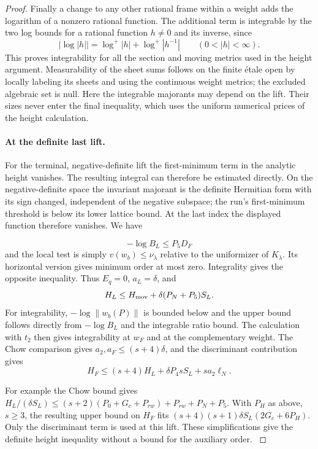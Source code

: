 \begin{proof}
Finally a change to any other rational frame within a
weight adds the logarithm of a nonzero rational function.
The additional term is integrable by the two log bounds for a rational function \(h\ne0\) and its inverse, since
\[
  \big|\log |h|\big|=\log^+|h|+\log^+|h^{-1}|\qquad(0<|h|<\infty).
\]
This proves integrability for all the section and moving
metrics used in the height argument. Measurability of the
sheet sums follows on the finite \'etale open by locally
labeling its sheets and using the continuous weight metrics;
the excluded algebraic set is null. Here the integrable
majorants may depend on the lift. Their sizes never enter
the final inequality, which uses the uniform numerical
prices of the height calculation. \label{cor:slice-integrals-2}

\paragraph{At the definite last lift.}
For the terminal, negative-definite lift the first-minimum term in the analytic height vanishes. The resulting integral can therefore be estimated directly. On the negative-definite space the invariant majorant
is the definite Hermitian form with its sign changed, independent
of the negative subspace; the run's first-minimum threshold is
below its lower lattice bound. At the last index the displayed function therefore vanishes. We have

\[
  -\log B_L\le P_5D_F
\]
 and the local test is simply
\(v(w_b)\le\nu_\lambda\) relative to the uniformizer of
\(K_\lambda\). Its horizontal version gives minimum order
at most zero. Integrality gives the opposite inequality.
Thus \(E_q=0\), \(a_L=\delta\), and
\[
 H_L\le H_{\rm mov}+\delta(P_N+P_5)S_L .
\]
For integrability, \(-\log\|w_b(P)\|\) is bounded below
and the upper bound follows directly from \(-\log B_L\)
and the integrable ratio bound. The calculation with
\(t_2\) then gives integrability at \(w_F\) and at the
complementary weight. The Chow comparison gives \(a_2,a_F\le(s+4)\delta\), and the discriminant contribution gives
\[
 H_F\le(s+4)H_L+\delta P_4 s S_L+s a_2\ell_N .
\]

For example the Chow bound gives
\(H_L/(\delta S_L)\le
(s+2)(P_0+G_c+P_{rw})+P_{rw}+P_N+P_5\).
With \(P_H\) as above, \(s\ge3\), the resulting upper bound
on \(H_F\) fits \((s+4)(s+1)\delta S_L(2G_c+6P_H)\).
Only the discriminant term is used at this lift. These
simplifications give the definite height inequality without
a bound for the auxiliary order. \label{cor:slice-integrals-3}
\end{proof}

